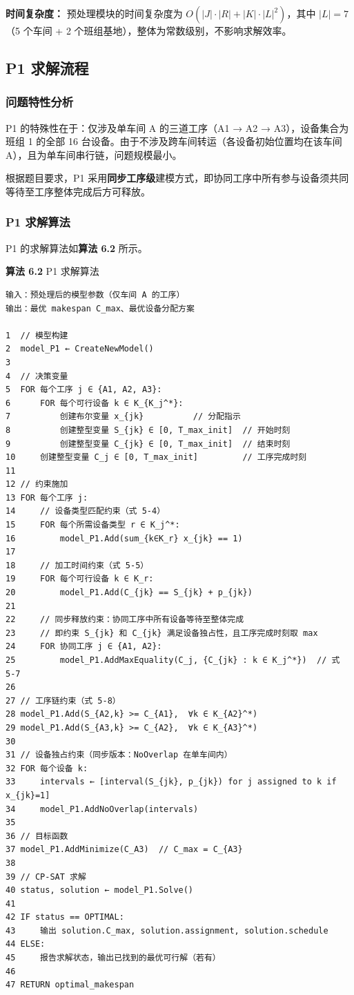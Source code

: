 \documentclass[UTF8,a4paper,12pt]{ctexart}
\begin{document}
\textbf{时间复杂度：} 预处理模块的时间复杂度为 $O(|J| \cdot |R| + |K| \cdot |L|^2)$，其中 $|L| = 7$（5 个车间 + 2 个班组基地），整体为常数级别，不影响求解效率。

\subsection{P1 求解流程}
\subsubsection{问题特性分析}
P1 的特殊性在于：仅涉及单车间 A 的三道工序（A1 → A2 → A3），设备集合为班组 1 的全部 16 台设备。由于不涉及跨车间转运（各设备初始位置均在该车间 A），且为单车间串行链，问题规模最小。

根据题目要求，P1 采用\textbf{同步工序级}建模方式，即协同工序中所有参与设备须共同等待至工序整体完成后方可释放。

\subsubsection{P1 求解算法}
P1 的求解算法如\textbf{算法 6.2} 所示。

\textbf{算法 6.2} P1 求解算法
\begin{verbatim}
输入：预处理后的模型参数（仅车间 A 的工序）
输出：最优 makespan C_max、最优设备分配方案

1  // 模型构建
2  model_P1 ← CreateNewModel()
3
4  // 决策变量
5  FOR 每个工序 j ∈ {A1, A2, A3}:
6      FOR 每个可行设备 k ∈ K_{K_j^*}:
7          创建布尔变量 x_{jk}          // 分配指示
8          创建整型变量 S_{jk} ∈ [0, T_max_init]  // 开始时刻
9          创建整型变量 C_{jk} ∈ [0, T_max_init]  // 结束时刻
10     创建整型变量 C_j ∈ [0, T_max_init]         // 工序完成时刻
11 
12 // 约束施加
13 FOR 每个工序 j:
14     // 设备类型匹配约束（式 5-4）
15     FOR 每个所需设备类型 r ∈ K_j^*:
16         model_P1.Add(sum_{k∈K_r} x_{jk} == 1)
17   
18     // 加工时间约束（式 5-5）
19     FOR 每个可行设备 k ∈ K_r:
20         model_P1.Add(C_{jk} == S_{jk} + p_{jk})
21   
22     // 同步释放约束：协同工序中所有设备等待至整体完成
23     // 即约束 S_{jk} 和 C_{jk} 满足设备独占性，且工序完成时刻取 max
24     FOR 协同工序 j ∈ {A1, A2}:
25         model_P1.AddMaxEquality(C_j, {C_{jk} : k ∈ K_j^*})  // 式 5-7
26 
27 // 工序链约束（式 5-8）
28 model_P1.Add(S_{A2,k} >= C_{A1},  ∀k ∈ K_{A2}^*)
29 model_P1.Add(S_{A3,k} >= C_{A2},  ∀k ∈ K_{A3}^*)
30 
31 // 设备独占约束（同步版本：NoOverlap 在单车间内）
32 FOR 每个设备 k:
33     intervals ← [interval(S_{jk}, p_{jk}) for j assigned to k if x_{jk}=1]
34     model_P1.AddNoOverlap(intervals)
35 
36 // 目标函数
37 model_P1.AddMinimize(C_A3)  // C_max = C_{A3}
38 
39 // CP-SAT 求解
40 status, solution ← model_P1.Solve()
41 
42 IF status == OPTIMAL:
43     输出 solution.C_max, solution.assignment, solution.schedule
44 ELSE:
45     报告求解状态，输出已找到的最优可行解（若有）
46 
47 RETURN optimal_makespan
\end{verbatim}
\end{document}
